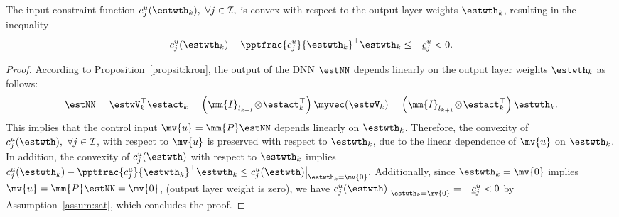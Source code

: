 \documentclass[letterpaper, journal]{IEEEtran}
\begin{document}
\begin{lem} \label{lem:convexity:input:constraint}
  The input constraint function $c_j^{u}(\estwth_k),\ \forall j \in \mathcal{I},$ is convex with respect to the output layer weights $\estwth_k$, resulting in the inequality 
  \begin{equation*}
    c_j^{u}(\estwth_k) 
    - 
    \pptfrac{c_j^{u}}{\estwth_k}^\top 
    \estwth_k 
    \le 
    - \underline{c}_j^{u}
    <
    0
    .
  \end{equation*}
\end{lem}

\begin{proof}
  According to Proposition~\ref{propsit:kron}, the output of the DNN $\estNN$ depends linearly on the output layer weights $\estwth_k$ as follows:
  \begin{equation} \label{eq:NN:linear}
    \estNN
    =
    \estwV_k^\top
    \estact_k
    = 
    \left(
      \mm{I}_{l_{k+1}}
      \!
      \otimes
      \! 
      \estact_k^\top
    \right)
    \myvec(\estwV_k)
    = 
    \left(
      \mm{I}_{l_{k+1}} 
      \!
      \otimes 
      \!
      \estact_k^\top
    \right)
    \estwth_k
    .
  \end{equation}
  This implies that the control input $\mv{u}=\mm{P}\estNN$ depends linearly on $\estwth_k$.
  Therefore, the convexity of $c_j^u(\estwth),\ \forall j \in \mathcal{I}$, with respect to $\mv{u}$ is preserved with respect to $\estwth_k$, due to the linear dependence of $\mv{u}$ on $\estwth_k$.
  In addition, the convexity of $c_j^u(\estwth)$ with respect to $\estwth_k$ implies 
  $
    c_j^{u}(\estwth_k) 
    - 
    \pptfrac{c_j^{u}}{\estwth_k}^\top 
    \estwth_k 
    \le 
    c_j^{u}(\estwth)\big|_{\estwth_k=\mv{0}}
    .
  $
  Additionally, since $\estwth_k=\mv{0}$ implies $\mv{u}=\mm{P}\estNN=\mv{0}$, (\ie output layer weight is zero), we have $c_j^{u}(\estwth)\big|_{\estwth_k=\mv{0}}=-\underline{c}_j^{u}<0$ by Assumption~\ref{assum:sat}, which concludes the proof.
\end{proof}
\end{document}
